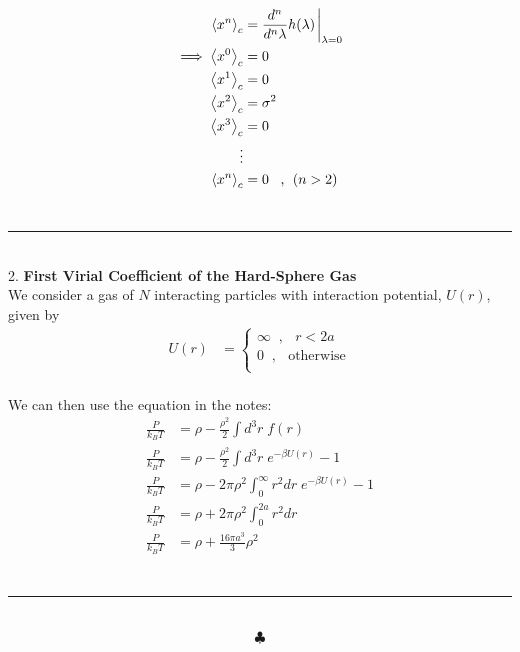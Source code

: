 \documentclass[]{article}
\begin{document}
\begin{enumerate}[i.]
\begin{equation}
\begin{aligned}
\expval{x^n}_c & = \frac{d^n}{d^n\lambda} h(\lambda) \eval_{\lambda=0}\\
\implies \expval{x^0}_c & = 0 \\
\expval{x^1}_c & = 0 \\
\expval{x^2}_c & = \sigma^2 \\
\expval{x^3}_c & = 0 \\
\vdots \\
\expval{x^n}_c & = 0 \; \; \; \text{, } \; (n>2) \\
\end{aligned}
\end{equation}\\


\end{enumerate}


\hfill 
\noindent\rule{15cm}{0.4pt} \\

2. {\bf First Virial Coefficient of the Hard-Sphere Gas} \\

We consider a gas of $N$ interacting particles with interaction potential, $U(r)$, given by \\

\begin{equation}
\begin{aligned}
U(r) & = \begin{cases}
\infty \; \; \text{, } \; \; r < 2a \\
0 \; \; \text{, } \; \; \text{otherwise} \\
\end{cases}
\end{aligned}
\end{equation}\\


We can then use the equation in the notes: \\

\begin{equation}
\begin{aligned}
\frac{ P}{ k_B T} & = \rho  - \frac{ \rho^2 }{2 } \int d^3r \; f(r) \\
\frac{ P}{ k_B T} & = \rho  - \frac{ \rho^2 }{2 } \int d^3r \; e^{ -\beta U(r)} - 1 \\
\frac{ P}{ k_B T} & = \rho  - 2\pi \rho^2  \int_0^{\infty} r^2 dr \; e^{ -\beta U(r)} - 1 \\
\frac{ P}{ k_B T} & = \rho  + 2\pi \rho^2  \int_0^{2a} r^2 dr \;  \\
\frac{ P}{ k_B T} & = \rho  +  \frac{16 \pi a^3}{3} \rho^2 \\
\end{aligned}
\end{equation}\\



\noindent\rule{15cm}{0.4pt} \\

$$\clubsuit$$
\end{document}
